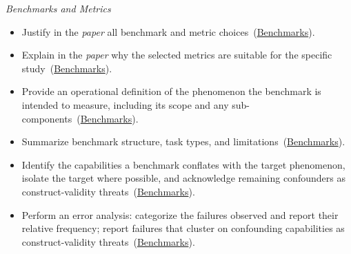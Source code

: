 \documentclass[smallextended]{svjour3}
\makeatletter
\newcommand{\must}{\textbf{must}\xspace}
\newcommand{\should}{\textbf{should}\xspace}
\newcommand{\paper}{\emph{paper}\xspace}
\newcommand{\paper}{\emph{paper}\xspace}
\newcommand{\iconM}{\usebox{\iconMbox}\xspace}
\newcommand{\iconS}{\usebox{\iconSbox}\xspace}
\newcommand{\iconM}{●\xspace}
\newcommand{\iconS}{○\xspace}
\newcommand{\condition}[1]{\texttt{\small[#1]}\,}
\newcommand{\condition}[1]{@@cond:#1@@}
\newcommand{\refbenchmarks}{\hyperref[sec:use-suitable-baselines-benchmarks-and-metrics]{Benchmarks}}
\newcommand{\refbenchmarks}{\href{/guidelines/use-suitable-baselines-benchmarks-and-metrics/}{Benchmarks}}
\makeatother
\begin{document}
\begin{appendices}
\noindent\textit{Benchmarks and Metrics}
\begin{itemize}[label={},leftmargin=*]
    \item \iconM Justify in the \paper all benchmark and metric choices~(\refbenchmarks).
    \item \iconM Explain in the \paper why the selected metrics are suitable for the specific study~(\refbenchmarks).
    \item \iconS Provide an operational definition of the phenomenon the benchmark is intended to measure, including its scope and any sub-components~(\refbenchmarks).
    \item \iconS Summarize benchmark structure, task types, and limitations~(\refbenchmarks).
    \item \iconS Identify the capabilities a benchmark conflates with the target phenomenon, isolate the target where possible, and acknowledge remaining confounders as construct-validity threats~(\refbenchmarks).
    \item \iconS Perform an error analysis: categorize the failures observed and report their relative frequency; report failures that cluster on confounding capabilities as construct-validity threats~(\refbenchmarks).

\end{itemize}
\end{appendices}
\end{document}
